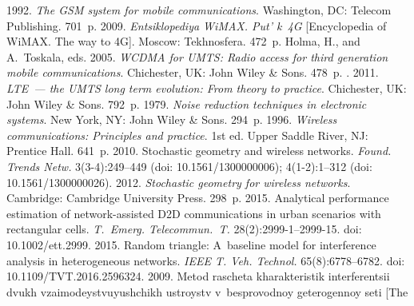   \begin{multicols}{2}

\renewcommand{\bibname}{\protect\rmfamily References}

{\small\frenchspacing
 {%
 \begin{thebibliography}{99}
 1992. \textit{The GSM system for mobile communications}. 
Washington, DC: Telecom Publishing. 701~p.
 2009. \textit{Entsiklopediya 
WiMAX. Put' k~4G} [Encyclopedia of WiMAX. The way to 4G]. Moscow: Tekhnosfera. 472~p.
Holma, H., and A.~Toskala, eds. 2005. \textit{WCDMA for UMTS: Radio access for third 
generation mobile communications}. Chichester, UK: John Wiley \& Sons. 478~p.
. 2011. \textit{LTE~--- the UMTS long term evolution: From 
theory to practice}. Chichester, UK: John Wiley \& Sons. 792~p.
 1979. \textit{Noise reduction techniques in electronic systems}. 
New York, NY: John Wiley \& Sons. 294~p.
 1996. \textit{Wireless communications: Principles and 
practice}. 1st ed. Upper Saddle River, NJ: Prentice Hall. 641~p.
 2010. Stochastic geometry and wireless networks. 
\textit{Found. Trends Netw.} 3(3-4):249--449 (doi: 10.1561/1300000006); 4(1-2):1--312 
(doi: 10.1561/1300000026).
 2012. \textit{Stochastic geometry for wireless networks}. Cambridge: 
Cambridge University Press. 298~p.
 2015. Analytical 
performance estimation of network-assisted D2D communications in urban scenarios with 
rectangular cells. \textit{T.~Emerg. Telecommun.~T.} 28(2):2999-1--2999-15. 
doi: 10.1002/ett.2999. 
 2015. 
Random triangle: A~baseline model for interference analysis in heterogeneous networks. 
\textit{IEEE T. Veh. Technol.} 65(8):6778--6782. doi: 10.1109/TVT.2016.2596324.
 2009. Metod rascheta kharakteristik 
interferentsii dvukh vza\-imo\-dey\-st\-vu\-yushchikh ustroystv v~besprovodnoy geterogennoy seti [The 

\end{thebibliography}}}
\end{multicols}

